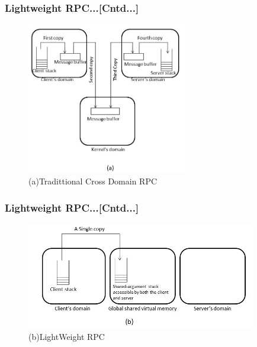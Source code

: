 \documentclass{beamer}
\begin{document}
\begin{frame}
	\frametitle{Lightweight RPC...[Cntd...]}
	\begin{figure}
		\centering
		\includegraphics[width=7cm]{fig414(a).jpg}
		\caption{(a)Tradittional Cross Domain RPC}
	\end{figure}				
\end{frame}


\begin{frame}
	\frametitle{Lightweight RPC...[Cntd...]}
	\begin{figure}
		\centering
		\includegraphics[width=10cm]{fig414(b).jpg}
		\caption{(b)LightWeight RPC}
	\end{figure}
\end{frame}
\end{document}

